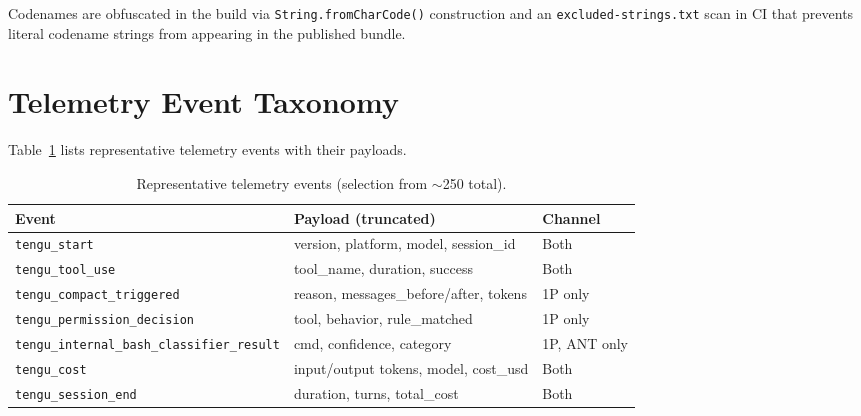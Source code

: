 \documentclass{article}
\newcommand{\file}[1]{\texttt{\small #1}}
\newcommand{\code}[1]{\texttt{#1}}
\begin{document}
Codenames are obfuscated in the build via \code{String.fromCharCode()} construction and an \file{excluded-strings.txt} scan in CI that prevents literal codename strings from appearing in the published bundle.

\section{Telemetry Event Taxonomy}
\label{app:telemetry}

Table~\ref{tab:events} lists representative telemetry events with their payloads.

\begin{table}[h]
\centering
\caption{Representative telemetry events (selection from $\sim$250 total).}
\label{tab:events}
\footnotesize
\begin{tabular}{lll}
\toprule
\textbf{Event} & \textbf{Payload (truncated)} & \textbf{Channel} \\
\midrule
\code{tengu\_start}               & version, platform, model, session\_id & Both \\
\code{tengu\_tool\_use}           & tool\_name, duration, success & Both \\
\code{tengu\_compact\_triggered}  & reason, messages\_before/after, tokens & 1P only \\
\code{tengu\_permission\_decision} & tool, behavior, rule\_matched & 1P only \\
\code{tengu\_internal\_bash\_classifier\_result} & cmd, confidence, category & 1P, ANT only \\
\code{tengu\_cost}                & input/output tokens, model, cost\_usd & Both \\
\code{tengu\_session\_end}        & duration, turns, total\_cost & Both \\
\bottomrule
\end{tabular}
\end{table}
\end{document}
